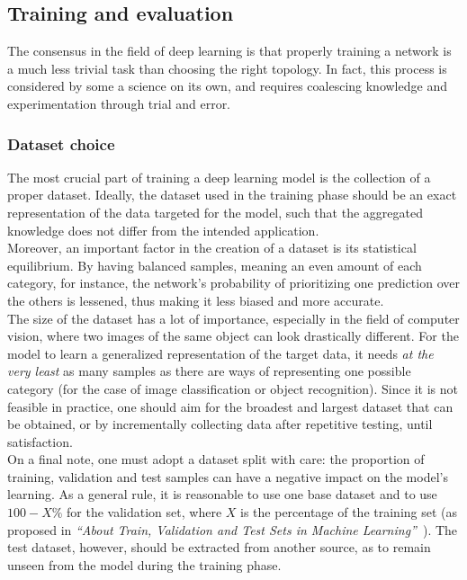 \subsection{Training and evaluation} \label{section:training}

The consensus in the field of deep learning is that properly training a network
is a much less trivial task than choosing the right topology. In fact, this
process is considered by some a science on its own, and requires coalescing
knowledge and experimentation through trial and error.

	\subsubsection{Dataset choice}

The most crucial part of training a deep learning model is the collection of a
proper dataset. Ideally, the dataset used in the training phase should be an
exact representation of the data targeted for the model, such that the
aggregated knowledge does not differ from the intended application.\\

Moreover, an important factor in the creation of a dataset is its statistical
equilibrium. By having balanced samples, meaning an even amount of each
category, for instance, the network's probability of prioritizing one prediction
over the others is lessened, thus making it less biased and more accurate.\\

The size of the dataset has a lot of importance, especially in the
field of computer vision, where two images of the same object can look
drastically different. For the model to learn a generalized representation of
the target data, it needs \emph{at the very least} as many samples as
there are ways of representing one possible category (for the case of image
classification or object recognition). Since it is not feasible in practice,
one should aim for the broadest and largest dataset that can be obtained, or
by incrementally collecting data after repetitive testing, until
satisfaction.\\

On a final note, one must adopt a dataset split with care: the proportion of
training, validation and test samples can have a negative impact on the 
model's learning. As a general rule, it is reasonable to use one base dataset
and to use $100-X\%$ for the validation set, where $X$ is the percentage of the
training set (as proposed in \emph{``About Train, Validation and Test Sets in Machine
Learning''}~\cite{DatasetSplitting}). The test dataset, however, should be
extracted from another source, as to remain unseen from the model during the
training phase.

